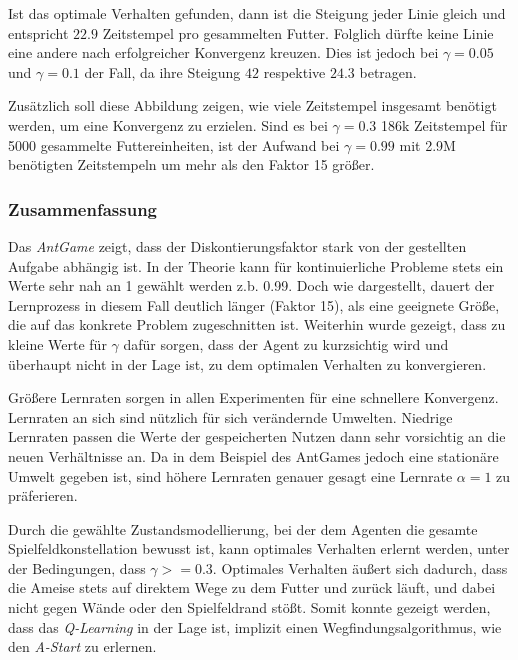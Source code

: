 Ist das optimale Verhalten gefunden, dann ist die Steigung jeder Linie gleich und entspricht $22.9$ Zeitstempel pro gesammelten Futter. Folglich dürfte keine Linie eine andere nach erfolgreicher Konvergenz kreuzen. Dies ist jedoch bei $\gamma = 0.05$ und $\gamma = 0.1$ der Fall, da ihre Steigung $42$ respektive $24.3$ betragen.
\par 
Zusätzlich soll diese Abbildung zeigen, wie viele Zeitstempel insgesamt benötigt werden, um eine Konvergenz zu erzielen. Sind es bei $\gamma = 0.3$ 186k Zeitstempel für 5000 gesammelte Futtereinheiten, ist der Aufwand bei $\gamma = 0.99$ mit 2.9M benötigten Zeitstempeln um mehr als den Faktor 15 größer.

\subsubsection{Zusammenfassung}
Das \textit{AntGame} zeigt, dass der Diskontierungsfaktor stark von der gestellten Aufgabe abhängig ist. In der Theorie kann für kontinuierliche Probleme stets ein Werte sehr nah an 1 gewählt werden z.b. 0.99. Doch wie dargestellt, dauert der Lernprozess in diesem Fall deutlich länger (Faktor 15), als eine geeignete Größe, die auf das konkrete Problem zugeschnitten ist. Weiterhin wurde gezeigt, dass zu kleine Werte für $\gamma$ dafür sorgen, dass der Agent zu \glqq kurzsichtig\grqq{} wird und überhaupt nicht in der Lage ist, zu dem optimalen Verhalten zu konvergieren.
\par 
Größere Lernraten sorgen in allen Experimenten für eine schnellere Konvergenz. Lernraten an sich sind nützlich für sich verändernde Umwelten. Niedrige Lernraten passen die Werte der gespeicherten Nutzen dann sehr vorsichtig an die neuen Verhältnisse an. Da in dem Beispiel des AntGames jedoch eine stationäre Umwelt gegeben ist, sind höhere Lernraten genauer gesagt eine Lernrate $\alpha = 1$ zu präferieren.
\par 
Durch die gewählte Zustandsmodellierung, bei der dem Agenten die gesamte Spielfeldkonstellation bewusst ist, kann optimales Verhalten erlernt werden, unter der Bedingungen, dass $\gamma >= 0.3$. Optimales Verhalten äußert sich dadurch, dass die Ameise stets auf direktem Wege zu dem Futter und zurück läuft, und dabei nicht gegen Wände oder den Spielfeldrand stößt. Somit konnte gezeigt werden, dass das \textit{Q-Learning } in der Lage ist, implizit einen Wegfindungsalgorithmus, wie den \textit{A-Start} zu erlernen.
